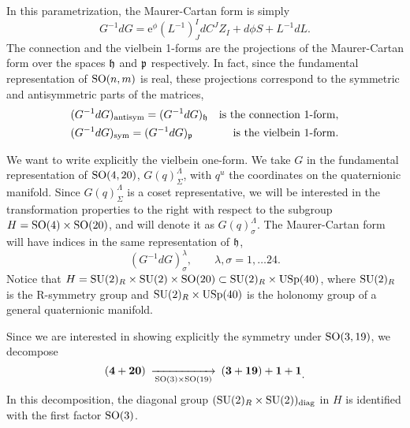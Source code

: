 \documentclass[a4paper,12pt]{article}
\begin{document}
In this parametrization, the Maurer-Cartan form is simply
\begin{equation}G^{-1}dG=\mathrm{e}^\phi (L^{-1})^I_JdC^JZ_I+ d\phi S
+L^{-1}dL.\label{vielbein}\end{equation} The connection and the
vielbein 1-forms are the projections of the Maurer-Cartan form
over the spaces $\mathfrak{h}$ and $\mathfrak{p}$ respectively. In fact, since  the
fundamental representation of $\mathrm{SO}(n,m)$ is real, these
projections correspond to the symmetric and antisymmetric parts of
the matrices,
\begin{eqnarray*}&(G^{-1}dG)_{\mathrm{antisym}}=(G^{-1}dG)_{\mathfrak{h}}
&\hbox{is the connection 1-form},\\
&(G^{-1}dG)_{\mathrm{sym}}=(G^{-1}dG)_{\mathfrak{p}} &\hbox{is the vielbein
1-form}. \end{eqnarray*}

We want to write explicitly the vielbein one-form. We take $G$ in
the fundamental representation of $\mathrm{SO}(4,20)$,
$G(q)^\Lambda_\Sigma$, with $q^u$ the coordinates on the
quaternionic manifold. Since $G(q)^\Lambda_\Sigma$ is a coset
representative, we will be interested in the transformation
properties to the right with respect to the subgroup
$H=\mathrm{SO}(4)\times \mathrm{SO}(20)$, and will denote it as
$G(q)^\Lambda_\sigma$. The Maurer-Cartan form will have indices in
the same representation of $\mathfrak{h}$,
$$(G^{-1}dG)^\lambda_\sigma, \qquad \lambda,\sigma=1,\dots 24.$$
Notice that $H=\mathrm{SU}(2)_R\times
\mathrm{SU}(2)\times\mathrm{SO}(20)\subset\mathrm{SU}(2)_R\times\mathrm{USp}(40)$, where
$\mathrm{SU}(2)_R$ is the R-symmetry group and $\mathrm{SU}(2)_R\times\mathrm{USp}(40)$
is the holonomy group of a general quaternionic manifold.


Since we are interested in showing explicitly the symmetry under
$\mathrm{SO}(3,19)$, we decompose
$$\begin{CD}(\mathbf{4+20})@>>\rSO(3)\times \rSO(19)>(\mathbf{3+19})+\mathbf{1}+\mathbf{1}\end{CD}.$$
In this decomposition, the diagonal group  $(\mathrm{SU}(2)_R\times
\mathrm{SU}(2))_\mathrm{diag}$ in $H$ is identified with the first factor
$\mathrm{SO}(3)$.
\end{document}
